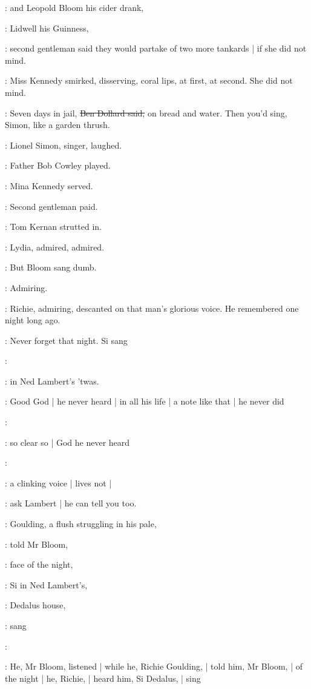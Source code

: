 :
and Leopold Bloom his cider drank,

:
Lidwell his Guinness,

:
second gentleman said they would partake of two more tankards |
if she did not mind.

:
Miss Kennedy smirked,
disserving,
coral lips,
at first,
at second.
She did not mind.

\dollard:
Seven days in jail,
\sout{Ben Dollard said,}
on bread and water.
Then you'd sing,
Simon,
like a garden thrush.

:
Lionel Simon,
singer,
laughed.

:
Father Bob Cowley played.

:
Mina Kennedy served.

:
Second gentleman paid.

:
Tom Kernan strutted in.

:
Lydia,
admired,
admired.

:
But Bloom sang dumb.

:
Admiring.

:
Richie,
admiring,
descanted on that man's glorious voice.
He remembered one night long ago.

\goulding:
Never forget that night.
Si sang

\simon:

\goulding:
in Ned Lambert's 'twas.

:
Good God |
he never heard |
in all his life |
a note like that |
he never did

\simon:

:
so clear so |
God he never heard

\simon:

:
a clinking voice |
lives not |

\goulding:
ask Lambert |
he can tell you too.

:
Goulding,
a flush struggling in his pale,

:
told Mr Bloom,

:
face of the night,

\goulding:
Si in Ned Lambert's,

:
Dedalus house,

\goulding:
sang

\simon:

:
He,
Mr Bloom,
listened |
while he,
Richie Goulding, |
told him,
Mr Bloom, |
of the night |
he,
Richie, |
heard him,
Si Dedalus, |
sing

